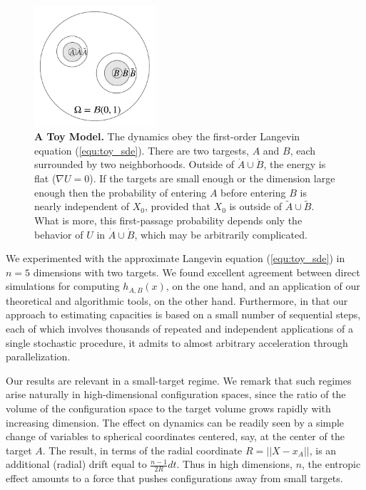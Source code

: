 \documentclass[nofootinbib,english, aip, jcp, priprint, graphicx,floatfix]{revtex4-1}
\theoremstyle{plain}
\theoremstyle{definition}
\theoremstyle{plain}
\newcommand{\dA}{{\dot A}}
\newcommand{\tA}{{\tilde A}}
\newcommand{\dB}{{\dot B}}
\newcommand{\tB}{{\tilde B}}
\begin{document}
\begin{figure}
	\centering	\includegraphics[width=0.4\textwidth]{ToyModel4.png}
	\caption{\footnotesize\linespread{1.}\selectfont{} {\bf A Toy Model.} The dynamics obey the first-order Langevin equation (\ref{equ:toy_sde}). There are two targests, $A$ and $B$, each surrounded by two neighborhoods. Outside of $\dA\cup\dB$, the energy is flat ($\nabla U=0$). If the targets are small enough or the dimension large enough then the probability of entering $A$ before entering $B$  is nearly independent of $X_0$, provided that $X_0$ is outside of $\tA\cup\tB$. What is more, this first-passage probability depends only the behavior of $U$ in $\dA\cup\dB$, which may be arbitrarily complicated.}
\label{fig:ToyModel}
\end{figure}

We experimented with the approximate Langevin equation (\ref{equ:toy_sde}) in $n=5$ dimensions with two targets. 
We found excellent agreement between direct simulations for computing $h_{A,B}(x)$, on the one hand, and an application of our theoretical and algorithmic tools, on the other hand. Furthermore, in that our approach to estimating capacities is based on a small number of sequential steps, each of which involves thousands of repeated and independent applications of a single stochastic procedure, it admits to almost arbitrary acceleration through parallelization.

Our results are relevant in a small-target regime. We remark that such regimes arise naturally in high-dimensional configuration spaces, since the ratio of the volume of the configuration space to the target volume grows rapidly with increasing dimension.
The effect on dynamics can be readily seen by a simple change of variables to spherical coordinates centered, say, at the center of the target $A$. The result, in terms of the radial coordinate $R=||X-x_A||$, is an additional (radial) drift equal to $\frac{n-1}{2R}dt$. Thus in high dimensions, $n$, the entropic effect amounts to a force that pushes configurations away from small targets. 
\end{document}
